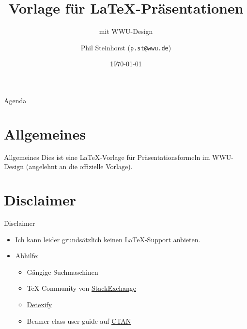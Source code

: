 \documentclass[10pt,
	wide,
	xcolor={x11names},
	hyperref={colorlinks=false},
	pantone312]{beamer}		%
\author{Phil Steinhorst (\texttt{p.st@wwu.de})}
\title{Vorlage für LaTeX-Präsentationen}
\subtitle{mit WWU-Design}
\date{\today}
\begin{document}
\begin{frame}[plain]
  \maketitle		%
\end{frame}

\begin{frame}[t]{Agenda}
\end{frame}

\section{Allgemeines}
\begin{frame}{Allgemeines}
	Dies ist eine \LaTeX-Vorlage für Präsentationsformeln im WWU-Design (angelehnt an die offizielle Vorlage).
\end{frame}

\section{Disclaimer}
\begin{frame}[t]{Disclaimer}
\begin{itemize}[<+->]
	\item Ich kann leider grundsätzlich keinen \LaTeX-Support anbieten.
	\item Abhilfe:
	\begin{itemize}
		\item Gängige Suchmaschinen
		\item \TeX-Community von \href{https://tex.stackexchange.org}{\underline{StackExchange}}
		\item \href{http://detexify.kirelabs.org}{\underline{Detexify}}
		\item Beamer class user guide auf \href{https://ctan.org/tex-archive/macros/latex/contrib/beamer/}{\underline{CTAN}}
	\end{itemize}
\end{itemize}
\end{frame}
\end{document}
